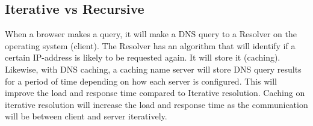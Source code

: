 \subsection{Iterative vs Recursive}

When a browser makes a query, it will make a DNS query to a Resolver on the operating system (client). The Resolver has an algorithm that will identify if a certain IP-address is likely to be requested again. It will store it (caching).
Likewise, with DNS caching, a caching name server will store DNS query results for a period of time depending on how each server is configured. This will improve the load and response time compared to Iterative resolution. Caching on iterative resolution will increase the load and response time as the communication will be between client and server iteratively. 